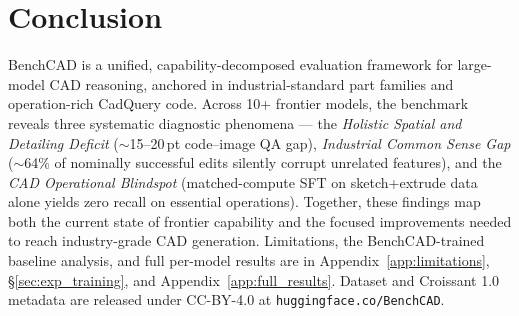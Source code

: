 \section{Conclusion}
\label{sec:conclusion}

BenchCAD is a unified, capability-decomposed evaluation framework for large-model CAD reasoning, anchored in industrial-standard part families and operation-rich CadQuery code.
Across 10+ frontier models, the benchmark reveals three systematic diagnostic phenomena --- the \emph{Holistic Spatial and Detailing Deficit} ($\sim$15--20\,pt code--image QA gap), \emph{Industrial Common Sense Gap} ($\sim$64\% of nominally successful edits silently corrupt unrelated features), and the \emph{CAD Operational Blindspot} (matched-compute SFT on sketch+extrude data alone yields zero recall on essential operations).
Together, these findings map both the current state of frontier capability and the focused improvements needed to reach industry-grade CAD generation.
Limitations, the BenchCAD-trained baseline analysis, and full per-model results are in Appendix~\ref{app:limitations}, \S\ref{sec:exp_training}, and Appendix~\ref{app:full_results}.
Dataset and Croissant 1.0 metadata are released under CC-BY-4.0 at \texttt{huggingface.co/BenchCAD}.
